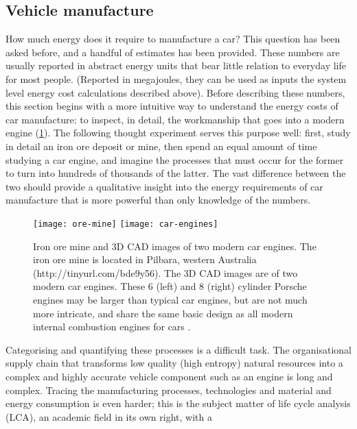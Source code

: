 \subsection{Vehicle manufacture} 
How much energy does it require to manufacture a car? This question has been
asked before, and a handful of estimates has been provided. These numbers
are usually reported in abstract energy
units that bear little relation to everyday life for most people. (Reported in
megajoules, they can be used as inputs the system level energy cost
calculations described above).
Before describing these numbers, this section begins with a more intuitive
way to understand the energy costs
of car manufacture: to inspect, in detail, the workmanship that goes into a
modern engine
(\cref{f:car-engine}). The following thought experiment serves this purpose
well: first, study in detail an iron ore
deposit or mine, then spend an equal amount of time studying a car
engine, and imagine the processes that must occur for the former to
turn into hundreds of thousands of the latter. The vast difference between the two
should provide a qualitative insight into the energy requirements of car
manufacture that is more powerful than only knowledge of the numbers.
\begin{figure}[t]
 \begin{center}
 \texttt{[image: ore-mine]}
 \texttt{[image: car-engines]}\end{center}
 \caption[Iron ore mine and 3D CAD images of two modern car engines]{
 Iron ore mine and 3D CAD images of two modern car engines. The iron
ore mine is located in Pilbara, western Australia (http://tinyurl.com/bde9y56).
The 3D CAD images are of two modern car engines. These 6 (left) and 8 (right)
cylinder Porsche engines may be larger than typical car engines, but are not
much more intricate, and share the same basic design as all modern internal
combustion engines for cars \citep[p.~1043]{grote2009springer}.}
 \label{f:car-engine}
\end{figure}
Categorising and quantifying these processes is a difficult task.
The organisational supply chain that transforms
low quality (high entropy) natural resources into a
complex and highly accurate vehicle component such as an engine is long
and complex. Tracing the manufacturing processes, technologies and
material and energy consumption is even harder; this is the subject matter
of life cycle analysis (LCA), an academic field in its own right, with a
